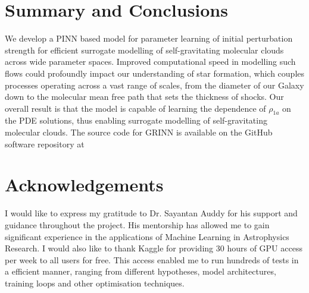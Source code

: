 \documentclass{article}
\begin{document}
\section{Summary and Conclusions}

We develop a PINN based model for parameter learning of initial perturbation strength for efficient surrogate modelling of self-gravitating molecular clouds across wide parameter spaces. Improved computational speed in
modelling such flows could profoundly impact our understanding of star formation, which couples processes operating across a vast range of scales, from the diameter of our Galaxy down to the molecular mean free path that sets the thickness of shocks.
Our overall result is that the model is capable of learning the dependence of $\rho_{1a}$ on the PDE solutions, thus enabling surrogate modelling of self-gravitating molecular clouds.
The source code for GRINN is available on the GitHub software repository at

\section{Acknowledgements}

I would like to express my gratitude to Dr. Sayantan Auddy for his support and guidance throughout the project. His mentorship has allowed me to gain significant experience in the applications of Machine Learning in Astrophysics Research.
I would also like to thank Kaggle for providing 30 hours of GPU access per week to all users for free. This access enabled me to run hundreds of tests in a efficient manner, ranging from different hypotheses, model architectures, training loops and other optimisation techniques.

\printbibliography
\end{document}
